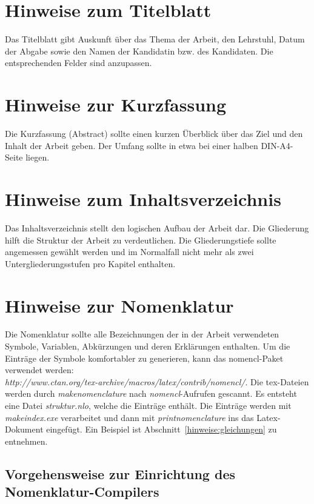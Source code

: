 \section{Hinweise zum Titelblatt}
\label{hinweise:titelblatt}

Das Titelblatt gibt Auskunft über das Thema der Arbeit, den
Lehrstuhl, Datum der Abgabe sowie den Namen der
Kandidatin bzw. des Kandidaten. Die entsprechenden Felder sind anzupassen.

\section{Hinweise zur Kurzfassung}
\label{hinweise:kurzfassung}

Die Kurzfassung (Abstract) sollte einen kurzen Überblick über das
Ziel und den Inhalt der Arbeit geben. Der Umfang sollte in etwa
bei einer halben DIN-A4-Seite liegen.

\section{Hinweise zum Inhaltsverzeichnis}
\label{hinweise:inhaltsverzeichnis}

Das Inhaltsverzeichnis stellt den logischen Aufbau der Arbeit dar.
Die Gliederung hilft die Struktur der Arbeit zu verdeutlichen. Die
Gliederungstiefe sollte angemessen gewählt werden und im
Normalfall nicht mehr als zwei Untergliederungsstufen pro Kapitel
enthalten.

\section{Hinweise zur Nomenklatur}
\label{hinweise:nomenklatur}

Die Nomenklatur sollte alle Bezeichnungen der in der Arbeit
verwendeten Symbole, Variablen, Abkürzungen und deren Erklärungen
enthalten. Um die Einträge der Symbole komfortabler zu generieren,
kann das nomencl-Paket verwendet werden: \\
\emph{http://www.ctan.org/tex-archive/macros/latex/contrib/nomencl/}.
Die tex-Dateien werden durch
\textit{makenomenclature} nach \textit{nomencl}-Aufrufen gescannt.
Es entsteht eine Datei \textit{struktur.nlo}, welche die Einträge enthält.
Die Einträge werden mit \textit{makeindex.exe} verarbeitet und dann mit
\textit{printnomenclature} ins das Latex-Dokument eingefügt.
Ein Beispiel ist Abschnitt~\ref{hinweise:gleichungen} zu entnehmen.

\subsection{Vorgehensweise zur Einrichtung des Nomenklatur-Compilers}

